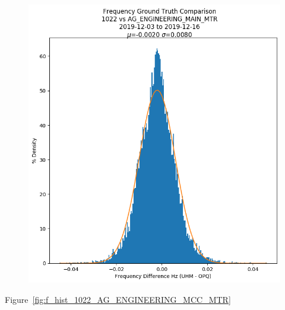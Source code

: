 \begin{figure}[H]
    \centering
    \includegraphics[width=\linewidth]{figures/f_hist_1022_AG_ENGINEERING_MAIN_MTR.png}
    \caption{}
    \label{fig:f_hist_1022_AG_ENGINEERING_MAIN_MTR}
\end{figure}

Figure~\ref{fig:f_hist_1022_AG_ENGINEERING_MCC_MTR}

